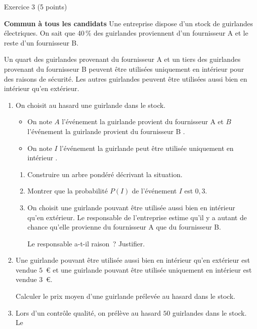 
\begin{h2}Exercice 3 (5 points)\end{h2}
\textbf{Commun à  tous les candidats}
\medskip
Une entreprise dispose d'un stock de guirlandes électriques. On sait que 40\,\% des
guirlandes proviennent d'un fournisseur A et le reste d'un fournisseur B.
\par
Un quart des guirlandes provenant du fournisseur A et un tiers des guirlandes
provenant du fournisseur B peuvent être utilisées uniquement en intérieur pour des
raisons de sécurité. Les autres guirlandes peuvent être utilisées aussi bien en
intérieur qu'en extérieur.
\bigskip
\begin{enumerate}
     \item On choisit au hasard une guirlande dans le stock.
     \begin{indent}
          \begin{itemize}
               \item On note $A$ l'événement \og la guirlande provient du fournisseur A\fg{} et
               $B$ l'événement \og la guirlande provient du fournisseur B \fg.
               \item On note $I$ l'événement \og la guirlande peut être utilisée uniquement en
               intérieur \fg.
          \end{itemize}
     \end{indent}
     \begin{enumerate}[label=\alph*.]
          \item Construire un arbre pondéré décrivant la situation.
          \item Montrer que la probabilité $P(I)$ de l'événement $I$ est $0,3$.
          \item On choisit une guirlande pouvant être utilisée aussi bien en intérieur qu'en
          extérieur. Le responsable de l'entreprise estime qu'il y a autant de chance
          qu'elle provienne du fournisseur A que du fournisseur B.
          \par
          Le responsable a-t-il raison~? Justifier.
     \end{enumerate}
     \item  Une guirlande pouvant être utilisée aussi bien en intérieur qu'en extérieur est
     vendue $5$~\euro{} et une guirlande pouvant être utilisée uniquement en intérieur est
     vendue $3$~\euro.
     \par
     Calculer le prix moyen d'une guirlande prélevée au hasard dans le stock.
     \item  Lors d'un contrôle qualité, on prélève au hasard $50$ guirlandes dans le stock. Le

\end{enumerate}
